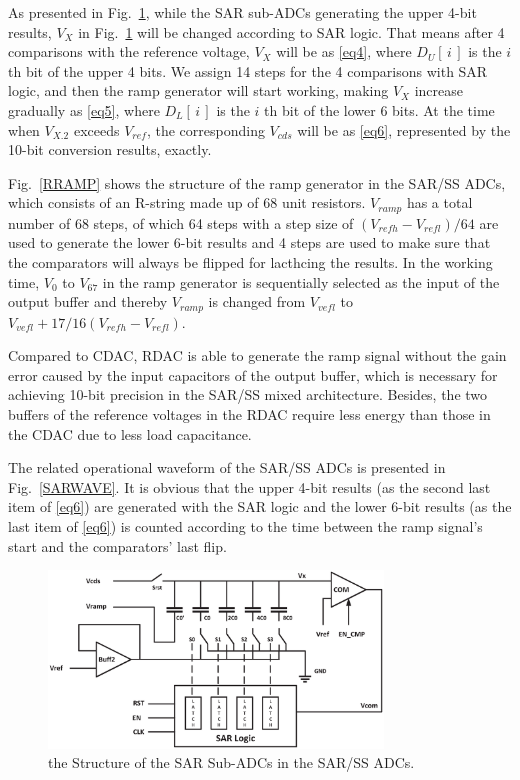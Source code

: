\documentclass[conference]{IEEEtran}
\begin{document}
As presented in Fig.~\ref{SAR}, while the SAR sub-ADCs generating the upper 4-bit results, $V_{X}$ in Fig.~\ref{SAR} will be changed according to SAR logic. That means after 4 comparisons 
with the reference voltage, $V_{X}$ will be as \eqref{eq4}, where $D_{U}\left[\,i\,\right]$ is the $i$ th bit of the upper 4 bits. We assign 14 steps for the 4 comparisons with SAR logic, 
and then the ramp generator will start working, making $V_{X}$ increase gradually as \eqref{eq5}, where $D_{L}\left[\,i\,\right]$ is the $i$ th bit of the lower 6 bits. 
At the time when $V_{X.2}$ exceeds $V_{ref}$, the corresponding $V_{cds}$ will be as \eqref{eq6}, represented by the 10-bit conversion results, exactly.

Fig.~\ref{RRAMP} shows the structure of the ramp generator in the SAR/SS ADCs, which consists of an R-string made up of 68 unit resistors. $V_{ramp}$ has a total number of 68 steps,
of which 64 steps with a step size of $(V_{refh}-V_{refl})/64$ are used to generate the lower 6-bit results and 4 steps are used to make sure that the comparators 
will always be flipped for lacthcing the results. In the working time, $V_{0}$ to $V_{67}$ in the ramp generator is sequentially selected as the input of the output buffer and thereby 
$V_{ramp}$ is changed from $V_{vefl}$ to $V_{vefl}+17/16(V_{refh}-V_{refl})$.

Compared to CDAC, RDAC is able to generate the ramp signal without the gain error caused by the input capacitors of the output buffer, 
which is necessary for achieving 10-bit precision in the SAR/SS mixed architecture.
Besides, the two buffers of the reference voltages in the RDAC require less energy than those in the CDAC due to less load capacitance.  

The related operational waveform of the SAR/SS ADCs is presented in Fig.~\ref{SARWAVE}. It is obvious that the upper 4-bit results (as the second last item of \eqref{eq6}) are generated 
with the SAR logic and the lower 6-bit results (as the last item of \eqref{eq6}) is counted according to the time between the ramp signal’s start and the comparators’ last flip. 

\begin{figure}[htbp]
	\centerline{\includegraphics[width=3.5in]{./Figures/SAR.eps}}
	\caption{the Structure of the SAR Sub-ADCs in the SAR/SS ADCs.}
	\label{SAR}
\end{figure}
\end{document}
